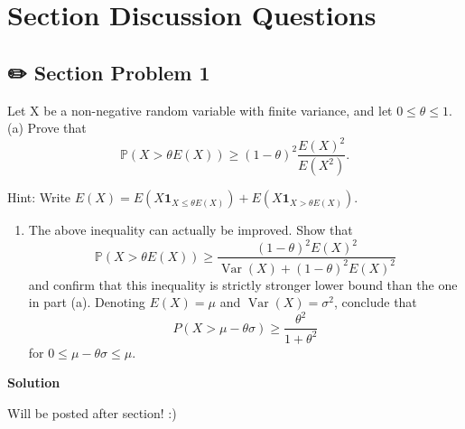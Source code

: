 \documentclass[
  letterpaper,
  DIV=11,
  numbers=noendperiod]{scrreprt}
\providecommand{\tightlist}{%
  \setlength{\itemsep}{0pt}\setlength{\parskip}{0pt}}\usepackage{longtable,booktabs,array}
\theoremstyle{plain}
\theoremstyle{definition}
\theoremstyle{remark}
\begin{document}
\hypertarget{section-discussion-questions-6}{%
\section*{Section Discussion
Questions}\label{section-discussion-questions-6}}


\hypertarget{section-problem-1-6}{%
\subsection*{✏️ Section Problem 1}\label{section-problem-1-6}}

Let \(\mathrm{X}\) be a non-negative random variable with finite
variance, and let \(0 \leq \theta \leq 1\). (a) Prove that \[
\mathbb{P}(X>\theta E(X)) \geq(1-\theta)^2 \frac{E(X)^2}{E\left(X^2\right)} .
\]

Hint: Write
\(E(X)=E\left(X \mathbf{1}_{X \leq \theta E(X)}\right)+E\left(X \mathbf{1}_{X>\theta E(X)}\right)\).

\begin{enumerate}
\def\labelenumi{(\alph{enumi})}
\setcounter{enumi}{1}
\tightlist
\item
  The above inequality can actually be improved. Show that \[
  \mathbb{P}(X>\theta E(X)) \geq \frac{(1-\theta)^2 E(X)^2}{\operatorname{Var}(X)+(1-\theta)^2 E(X)^2}
  \] and confirm that this inequality is strictly stronger lower bound
  than the one in part (a). Denoting \(E(X)=\mu\) and
  \(\operatorname{Var}(X)=\sigma^2\), conclude that \[
  P(X>\mu-\theta \sigma) \geq \frac{\theta^2}{1+\theta^2}
  \] for \(0 \leq \mu-\theta \sigma \leq \mu\).
\end{enumerate}

\begin{tcolorbox}[enhanced jigsaw, breakable, colback=white, opacityback=0, bottomrule=.15mm, colframe=quarto-callout-tip-color-frame, arc=.35mm, leftrule=.75mm, left=2mm, rightrule=.15mm, toprule=.15mm]
\begin{minipage}[t]{5.5mm}
\textcolor{quarto-callout-tip-color}{\faLightbulb}
\end{minipage}%
\begin{minipage}[t]{\textwidth - 5.5mm}

\textbf{Solution}\vspace{2mm}

Will be posted after section! :)

\end{minipage}%
\end{tcolorbox}
\end{document}
